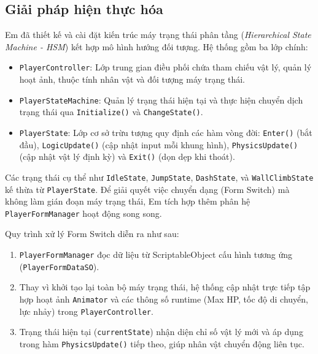 \subsection{Giải pháp hiện thực hóa}
Em đã thiết kế và cài đặt kiến trúc máy trạng thái phân tầng (\textit{Hierarchical State Machine - HSM}) kết hợp mô hình hướng đối tượng. Hệ thống gồm ba lớp chính:
\begin{itemize}
    \item \texttt{PlayerController}: Lớp trung gian điều phối chứa tham chiếu vật lý, quản lý hoạt ảnh, thuộc tính nhân vật và đối tượng máy trạng thái.
    \item \texttt{PlayerStateMachine}: Quản lý trạng thái hiện tại và thực hiện chuyển dịch trạng thái qua \texttt{Initialize()} và \texttt{ChangeState()}.
    \item \texttt{PlayerState}: Lớp cơ sở trừu tượng quy định các hàm vòng đời: \texttt{Enter()} (bắt đầu), \texttt{LogicUpdate()} (cập nhật input mỗi khung hình), \texttt{PhysicsUpdate()} (cập nhật vật lý định kỳ) và \texttt{Exit()} (dọn dẹp khi thoát).
\end{itemize}

Các trạng thái cụ thể như \texttt{IdleState}, \texttt{JumpState}, \texttt{DashState}, và \texttt{WallClimbState} kế thừa từ \texttt{PlayerState}. Để giải quyết việc chuyển dạng (Form Switch) mà không làm gián đoạn máy trạng thái, Em tích hợp thêm phân hệ \texttt{PlayerFormManager} hoạt động song song.

Quy trình xử lý Form Switch diễn ra như sau:
\begin{enumerate}
    \item \texttt{PlayerFormManager} đọc dữ liệu từ ScriptableObject cấu hình tương ứng (\texttt{PlayerFormDataSO}).
    \item Thay vì khởi tạo lại toàn bộ máy trạng thái, hệ thống cập nhật trực tiếp tập hợp hoạt ảnh \texttt{Animator} và các thông số runtime (Max HP, tốc độ di chuyển, lực nhảy) trong \texttt{PlayerController}.
    \item Trạng thái hiện tại (\texttt{currentState}) nhận diện chỉ số vật lý mới và áp dụng trong hàm \texttt{PhysicsUpdate()} tiếp theo, giúp nhân vật chuyển động liên tục.
\end{enumerate}

